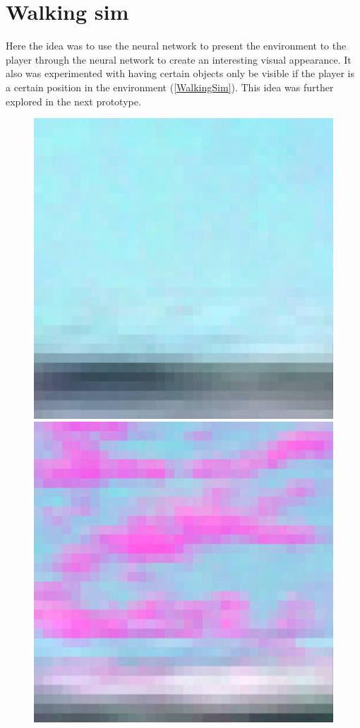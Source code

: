 \section{Walking sim}
Here the idea was to use the neural network to present the environment to the player through the neural network to create an interesting visual appearance. It also was experimented with having certain objects only be visible if the player is a certain position in the environment (\cref{WalkingSim}). This idea was further explored in the next prototype.

\begin{figure}[p]
  \centering
  \includegraphics[width=\imgWidth]{images/workflow/WalkingSimNothing.png} \\[\picVdist]
  \includegraphics[width=\imgWidth]{images/workflow/WalkingSimCloud.png}

\end{figure}
